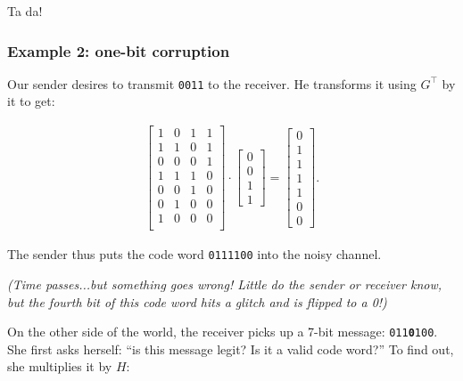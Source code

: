 Ta da!

\subsubsection{Example 2: one-bit corruption}

Our sender desires to transmit \texttt{0011} to the receiver.
He transforms it using $G^\intercal$ by it to get:

\vspace{-.15in}
\begin{align*}
\begin{bmatrix}
1 & 0 & 1 & 1\\
1 & 1 & 0 & 1\\
0 & 0 & 0 & 1\\
1 & 1 & 1 & 0\\
0 & 0 & 1 & 0\\
0 & 1 & 0 & 0\\
1 & 0 & 0 & 0\\
\end{bmatrix} \cdot
\begin{bmatrix}
0 \\ 0 \\ 1 \\ 1
\end{bmatrix} = 
\begin{bmatrix}
0 \\ 1 \\ 1 \\ 1 \\ 1 \\ 0 \\ 0
\end{bmatrix}.
\end{align*}
\vspace{-.15in}

The sender thus puts the code word \texttt{0111100} into the noisy channel.

\textit{(Time passes...but something goes wrong! Little do the sender or
receiver know, but the fourth bit of this code word hits a glitch and is
flipped to a 0!)}


On the other side of the world, the receiver picks up a 7-bit message:
\texttt{011\textbf{0}100}. She first asks herself: ``is this message legit? Is
it a valid code word?'' To find out, she multiplies it by $H$:

